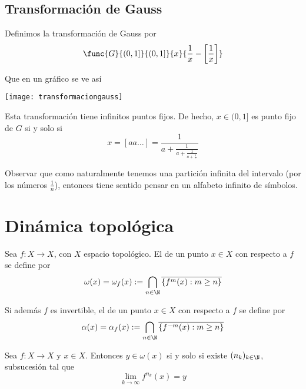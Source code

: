 \documentclass[	docname= Sistemas\ Din\'amicos,
				finished=1,
				semester=1,
				year=2017,
				professor=Godofredo\ Iommi,
				sigla=MAT2565]{apunte}
\begin{document}
\subsection{Transformación de Gauss}
Definimos la transformación de Gauss por
	$$\func{G}{(0,1]}{(0,1]}
			{x}{\frac{1}{x} - \left[\frac{1}{x}\right]}$$

Que en un gráfico se ve así
	\begin{center}
		\texttt{[image: transformaciongauss]}
	\end{center}

Esta transformación tiene infinitos puntos fijos. De hecho, $x \in (0,1]$ es punto fijo de $G$ si y solo si
	$$x = [aa \ldots] = \frac{1}{a + \frac{1}{a + \frac{1}{a + \frac{1}{\ddots}}}}$$ 

Observar que como naturalmente tenemos una partición infinita del intervalo (por los números $\frac{1}{n}$), entonces tiene sentido pensar en un alfabeto infinito de símbolos.

\newpage
\section{Dinámica topológica}

\begin{defn} Sea $f: X \to X$, con $X$ espacio topológico. El  de un punto $x \in X$ con respecto a $f$ se define por
	$$\omega(x) = \omega_{f}(x) := \bigcap_{n \in \N} \overline{\{f^{m}(x) : m \geq n\}}$$

Si además $f$ es invertible, el  de un punto $x \in X$ con respecto a $f$ se define por
	$$\alpha(x) = \alpha_{f}(x) := \bigcap_{n \in \N} \overline{\{f^{-m}(x) : m \geq n\}}$$
\end{defn}

\begin{prop} Sea $f: X \to X$ y $x \in X$. Entonces $y \in \omega(x)$ si y solo si existe $(n_{k})_{k \in \N}$, subsucesión tal que
	$$\lim_{k \to \infty} f^{n_{k}}(x) = y$$
\end{prop}
\end{document}
